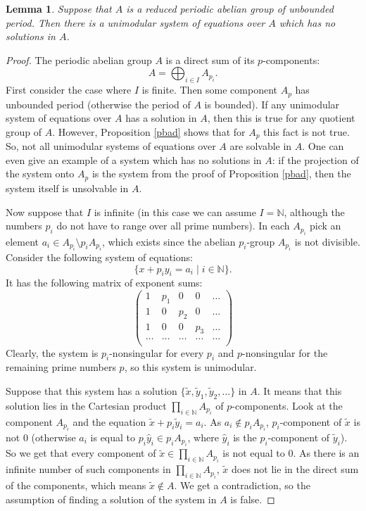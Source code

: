 \documentclass{article}
\newtheorem{lemma}{Lemma}
\theoremstyle{definition}
\theoremstyle{remark}
\let\tilde\widetilde
\let\hat\widehat
\begin{document}
\begin{lemma}\label{bad}
Suppose that $A$ is a reduced periodic abelian group
of unbounded period.
Then there is a unimodular system of equations
over $A$
which has no solutions in $A$.
\end{lemma}
\begin{proof}
The periodic abelian group $A$ is a direct sum
of its $p$-components:
$$
A = \bigoplus_{i \in I} A_{p_i}.
$$
First consider the case where $I$ is finite.
Then some component $A_p$ has unbounded period
(otherwise the period of $A$ is bounded).
If any unimodular system of equations over $A$ has a solution in $A$,
then this is true for any quotient group of $A$.
However, Proposition \ref{pbad} shows that
for $A_p$ this fact is not true.
So, not all unimodular systems of equations over $A$
are solvable in $A$. One can even give an example
of a system which has no solutions in $A$: if the projection
of the system onto $A_p$ is the system from the proof of Proposition \ref{pbad},
then the system itself is unsolvable in $A$.

Now suppose that $I$ is infinite (in this case we can assume $I = \mathbb N$,
although the numbers $p_i$ do not have to range over all prime numbers).
In each $A_{p_i}$ pick an element
$a_i \in A_{p_i}\setminus p_iA_{p_i}$, which exists
since the abelian $p_i$-group $A_{p_i}$ is not divisible.
Consider the following system of equations:
$$
\{x + p_i y_i = a_i \mid i \in \mathbb N \}.
$$
It has the following matrix of exponent sums:
$$
\begin{pmatrix}
1 & p_1 & 0 & 0 &\dots \\
1 & 0 & p_2 & 0 &\dots \\
1 & 0 & 0 & p_3 & \dots \\
\dots & \dots & \dots & \dots & \dots \\
\end{pmatrix}
$$
Clearly, the system is $p_i$-nonsingular
for every $p_i$ and $p$-nonsingular
for the remaining prime numbers $p$, so this system is unimodular.

Suppose that this system has a solution $\{\tilde x, \tilde y_1, \tilde y_2, \ldots\}$
in $A$. It means that this solution lies in the Cartesian product
$\prod\limits_{i \in \mathbb N} A_{p_i}$ of $p$-components.
Look at the component $A_{p_i}$ and the equation $\tilde x + p_i \tilde y_i = a_i$.
As $a_i \notin p_i A_{p_i}$, $p_i$-component of $\tilde x$
is not $0$ (otherwise $a_i$ is equal to $p_i \hat y_i \in p_iA_{p_i}$, where
$\hat y_i$ is the $p_i$-component of $\tilde y_i$).
So we get that every component of $\tilde x\in\prod\limits_{i \in \mathbb N} A_{p_i}$
is not equal to $0$.
As there is an infinite number of such components in $\prod\limits_{i \in \mathbb N} A_{p_i}$,
$\tilde x$ does not lie in the direct sum of the components, which means $\tilde x \notin A$.
We get a contradiction, so the assumption of finding a solution
of the system in $A$ is false.
\end{proof}
\end{document}
